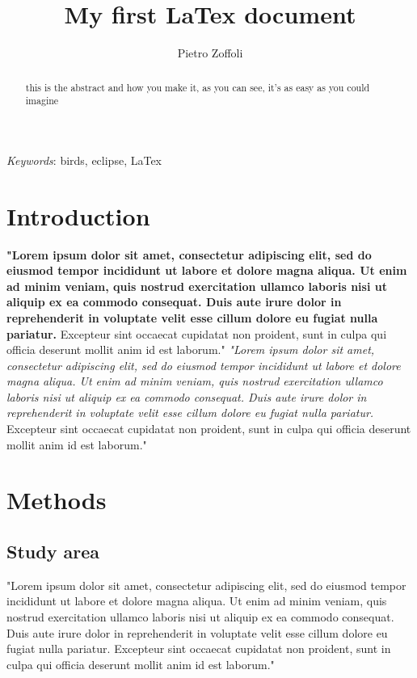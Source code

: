 \documentclass[12pt]{article}
\title{My first LaTex document}
\author{Pietro Zoffoli}
\begin{document}
\maketitle 

\begin{abstract}
   \noindent this is the abstract and how you make it, as you can see, it's as easy as you could imagine
\end{abstract}
\bigskip
\textit{Keywords}: birds, eclipse, LaTex

\tableofcontents 

\section{Introduction}\label{sec:intro}
\textbf{"Lorem ipsum dolor sit amet, consectetur adipiscing elit, sed do eiusmod tempor incididunt ut labore et dolore magna aliqua. Ut enim ad minim veniam, quis nostrud exercitation ullamco laboris nisi ut aliquip ex ea commodo consequat. Duis aute irure dolor in reprehenderit in voluptate velit esse cillum dolore eu fugiat nulla pariatur.} Excepteur sint occaecat cupidatat non proident, sunt in culpa qui officia deserunt mollit anim id est laborum."
\bigskip %
\noindent \textit{"Lorem ipsum dolor sit amet, consectetur adipiscing elit, sed do eiusmod tempor incididunt ut labore et dolore magna aliqua. Ut enim ad minim veniam, quis nostrud exercitation ullamco laboris nisi ut aliquip ex ea commodo consequat. Duis aute irure dolor in reprehenderit in voluptate velit esse cillum dolore eu fugiat nulla pariatur.} Excepteur sint occaecat cupidatat non proident, sunt in culpa qui officia deserunt mollit anim id est laborum."

\section{Methods}
\subsection{Study area}

"Lorem ipsum dolor sit amet, consectetur adipiscing elit, sed do eiusmod tempor incididunt ut labore et dolore magna aliqua. Ut enim ad minim veniam, quis nostrud exercitation ullamco laboris nisi ut aliquip ex ea commodo consequat. Duis aute irure dolor in reprehenderit in voluptate velit esse cillum dolore eu fugiat nulla pariatur. Excepteur sint occaecat cupidatat non proident, sunt in culpa qui officia deserunt mollit anim id est laborum."
\end{document}
